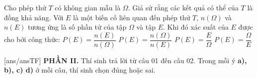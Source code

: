 \begin{ex}%
    Cho phép thử $T$ có không gian mẫu là $\Omega$. Giả sử rằng các kết quả có thể của $T$ là đồng khả năng. Với $E$ là một biến cố liên quan đến phép thử $T$, $n(\Omega)$ và $n(E)$ tương ứng là số phần tử của tập $\Omega$ và tập $E$. Khi đó xác suất của $E$ được cho bởi công thức:
    \choice
    {\True $P(E) = \dfrac{n(E)}{n(\Omega)}$}
    {$P(E) = \dfrac{n(\Omega)}{n(E)}$}
    {$P(E) = \dfrac{E}{\Omega}$}
    {$P(E) = \dfrac{\Omega}{E}$}
\end{ex}


\setcounter{ex}{0}
[ans/ansTF]
\noindent\textbf{PHẦN II.} Thí sinh trả lời từ câu 01 đến câu 02. Trong mỗi ý \textbf{a), b), c) d)} ở mỗi câu, thí sinh chọn đúng hoặc sai.



